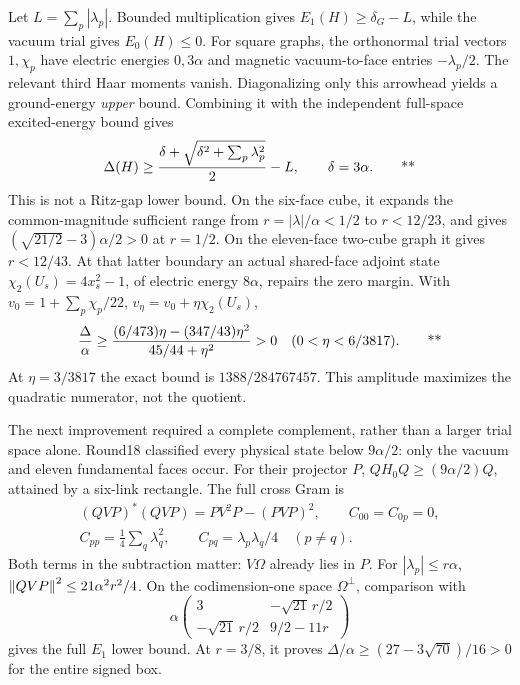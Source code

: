 Let \(L=\sum_p|\lambda_p|\). Bounded multiplication gives
\(E_1(H)\ge\delta_G-L\), while the vacuum trial gives \(E_0(H)\le0\).
For square graphs, the orthonormal trial vectors \(1,\chi_p\) have electric
energies \(0,3\alpha\) and magnetic vacuum-to-face entries
\(-\lambda_p/2\). The relevant third Haar moments vanish. Diagonalizing
only this arrowhead yields a ground-energy \emph{upper} bound. Combining
it with the independent full-space excited-energy bound gives
\begin{equation}
 \Delta(H)\ge
 \frac{\delta+\sqrt{\delta^2+\sum_p\lambda_p^2}}2-L,
 \qquad \delta=3\alpha.
 \qquad\text{**}
 \label{eq:middle-arrow}
\end{equation}
This is not a Ritz-gap lower bound. On the six-face cube, it expands the
common-magnitude sufficient range from
\(r=|\lambda|/\alpha<1/2\) to \(r<12/23\), and gives
\((\sqrt{21/2}-3)\alpha/2>0\) at \(r=1/2\).
On the eleven-face two-cube graph it gives \(r<12/43\).
At that latter boundary an actual shared-face adjoint state
\(\chi_2(U_s)=4x_s^2-1\), of electric energy \(8\alpha\), repairs the
zero margin. With
\(v_0=1+\sum_p\chi_p/22\), \(v_\eta=v_0+\eta\chi_2(U_s)\),
\[
 \frac{\Delta}{\alpha}\ge
 \frac{(6/473)\eta-(347/43)\eta^2}{45/44+\eta^2}>0
 \quad(0<\eta<6/3817).
 \qquad\text{**}
\]
At \(\eta=3/3817\) the exact bound is \(1388/284767457\).
This amplitude maximizes the quadratic numerator, not the quotient.

The next improvement required a complete complement, rather than a larger
trial space alone. Round18 classified every physical state below
\(9\alpha/2\): only the vacuum and eleven fundamental faces occur.
For their projector \(P\), \(QH_0Q\ge(9\alpha/2)Q\), attained by a
six-link rectangle. The full cross Gram is
\[
 \begin{gathered}
 (QVP)^*(QVP)=PV^2P-(PVP)^2,\qquad C_{00}=C_{0p}=0,\\
 C_{pp}=\tfrac14\sum_q\lambda_q^2,\qquad
 C_{pq}=\lambda_p\lambda_q/4\quad(p\ne q).
 \end{gathered}
\]
Both terms in the subtraction matter: \(V\Omega\) already lies in \(P\).
For \(|\lambda_p|\le r\alpha\),
\(\left\lVert QVP\right\rVert^2\le21\alpha^2r^2/4\).
On the codimension-one space \(\Omega^\perp\), comparison with
\[
 \alpha\begin{pmatrix}3&-\sqrt{21}\,r/2\\
 -\sqrt{21}\,r/2&9/2-11r\end{pmatrix}
\]
gives the full \(E_1\) lower bound. At \(r=3/8\), it proves
\(\Delta/\alpha\ge(27-3\sqrt{70})/16>0\) for the entire signed box.

